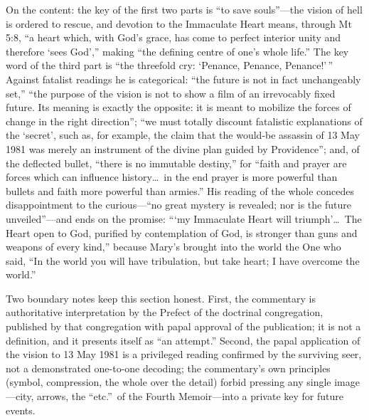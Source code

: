 On the content: the key of the first two parts is ``to save
souls''---the vision of hell is ordered to rescue, and devotion to
the Immaculate Heart means, through Mt 5:8, ``a heart which, with
God's grace, has come to perfect interior unity and therefore `sees
God','' making  ``the defining centre of one's whole
life.'' The key word of the third part is ``the threefold cry:
`Penance, Penance, Penance!'\,'' Against fatalist readings he is
categorical: ``the future is not in fact unchangeably set,'' ``the
purpose of the vision is not to show a film of an irrevocably fixed
future. Its meaning is exactly the opposite: it is meant to mobilize
the forces of change in the right direction''; ``we must totally
discount fatalistic explanations of the `secret', such as, for
example, the claim that the would-be assassin of 13 May 1981 was
merely an instrument of the divine plan guided by Providence''; and,
of the deflected bullet, ``there is no immutable destiny,'' for
``faith and prayer are forces which can influence history\ldots\ in
the end prayer is more powerful than bullets and faith more powerful
than armies.'' His reading of the whole concedes disappointment to
the curious---``no great mystery is revealed; nor is the future
unveiled''---and ends on the promise: ```my Immaculate Heart will
triumph'\ldots\ The Heart open to God, purified by contemplation of
God, is stronger than guns and weapons of every kind,'' because
Mary's  brought into the world the One who said, ``In the
world you will have tribulation, but take heart; I have overcome the
world.''

Two boundary notes keep this section honest. First, the commentary is
authoritative interpretation by the Prefect of the doctrinal
congregation, published by that congregation with papal approval of
the publication; it is not a definition, and it presents itself as
``an attempt.'' Second, the papal application of the vision to
13 May 1981 is a privileged reading confirmed by the surviving seer,
not a demonstrated one-to-one decoding; the commentary's own
principles (symbol, compression, the whole over the detail) forbid
pressing any single image---city, arrows, the ``etc.''\ of the Fourth
Memoir---into a private key for future events.
